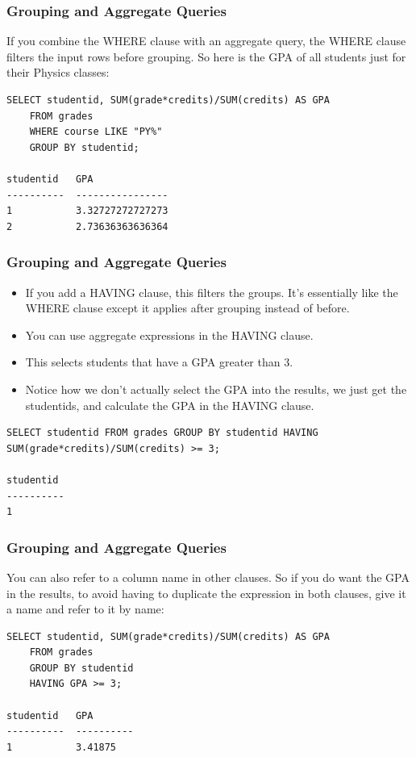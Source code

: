 \begin{frame}[fragile] \frametitle{Grouping and Aggregate Queries}
If you combine the WHERE clause with an aggregate query, the WHERE clause filters the input rows before grouping. So here is the GPA of all students just for their Physics classes:
\begin{lstlisting}
SELECT studentid, SUM(grade*credits)/SUM(credits) AS GPA
    FROM grades
    WHERE course LIKE "PY%"
    GROUP BY studentid;

studentid   GPA             
----------  ----------------
1           3.32727272727273
2           2.73636363636364  
\end{lstlisting}
\end{frame}

\begin{frame}[fragile] \frametitle{Grouping and Aggregate Queries}
\begin{itemize}
\item If you add a HAVING clause, this filters the groups. It's essentially like the WHERE clause except it applies after grouping instead of before. 
\item You can use aggregate expressions in the HAVING clause.
\item This selects students that have a GPA greater than 3. 
\item Notice how we don't actually select the GPA into the results, we just get the studentids, and calculate the GPA in the HAVING clause.
\end{itemize}
\begin{lstlisting}
SELECT studentid FROM grades GROUP BY studentid HAVING SUM(grade*credits)/SUM(credits) >= 3;

studentid 
----------
1     
\end{lstlisting}
\end{frame}

\begin{frame}[fragile] \frametitle{Grouping and Aggregate Queries}
You can also refer to a column name in other clauses. So if you do want the GPA in the results, to avoid having to duplicate the expression in both clauses, give it a name and refer to it by name:
\begin{lstlisting}
SELECT studentid, SUM(grade*credits)/SUM(credits) AS GPA 
    FROM grades
    GROUP BY studentid
    HAVING GPA >= 3;

studentid   GPA       
----------  ----------
1           3.41875   
\end{lstlisting}
\end{frame}

